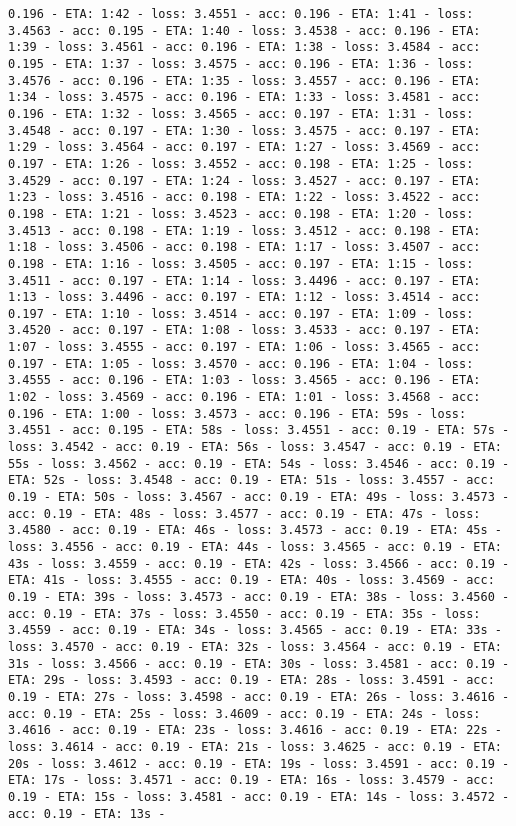 \documentclass[11pt]{article}
\begin{document}
\begin{Verbatim}[commandchars=\\\{\}]
0.196 - ETA: 1:42 - loss: 3.4551 - acc: 0.196 - ETA: 1:41 - loss: 3.4563 - acc: 0.195 - ETA: 1:40 - loss: 3.4538 - acc: 0.196 - ETA: 1:39 - loss: 3.4561 - acc: 0.196 - ETA: 1:38 - loss: 3.4584 - acc: 0.195 - ETA: 1:37 - loss: 3.4575 - acc: 0.196 - ETA: 1:36 - loss: 3.4576 - acc: 0.196 - ETA: 1:35 - loss: 3.4557 - acc: 0.196 - ETA: 1:34 - loss: 3.4575 - acc: 0.196 - ETA: 1:33 - loss: 3.4581 - acc: 0.196 - ETA: 1:32 - loss: 3.4565 - acc: 0.197 - ETA: 1:31 - loss: 3.4548 - acc: 0.197 - ETA: 1:30 - loss: 3.4575 - acc: 0.197 - ETA: 1:29 - loss: 3.4564 - acc: 0.197 - ETA: 1:27 - loss: 3.4569 - acc: 0.197 - ETA: 1:26 - loss: 3.4552 - acc: 0.198 - ETA: 1:25 - loss: 3.4529 - acc: 0.197 - ETA: 1:24 - loss: 3.4527 - acc: 0.197 - ETA: 1:23 - loss: 3.4516 - acc: 0.198 - ETA: 1:22 - loss: 3.4522 - acc: 0.198 - ETA: 1:21 - loss: 3.4523 - acc: 0.198 - ETA: 1:20 - loss: 3.4513 - acc: 0.198 - ETA: 1:19 - loss: 3.4512 - acc: 0.198 - ETA: 1:18 - loss: 3.4506 - acc: 0.198 - ETA: 1:17 - loss: 3.4507 - acc: 0.198 - ETA: 1:16 - loss: 3.4505 - acc: 0.197 - ETA: 1:15 - loss: 3.4511 - acc: 0.197 - ETA: 1:14 - loss: 3.4496 - acc: 0.197 - ETA: 1:13 - loss: 3.4496 - acc: 0.197 - ETA: 1:12 - loss: 3.4514 - acc: 0.197 - ETA: 1:10 - loss: 3.4514 - acc: 0.197 - ETA: 1:09 - loss: 3.4520 - acc: 0.197 - ETA: 1:08 - loss: 3.4533 - acc: 0.197 - ETA: 1:07 - loss: 3.4555 - acc: 0.197 - ETA: 1:06 - loss: 3.4565 - acc: 0.197 - ETA: 1:05 - loss: 3.4570 - acc: 0.196 - ETA: 1:04 - loss: 3.4555 - acc: 0.196 - ETA: 1:03 - loss: 3.4565 - acc: 0.196 - ETA: 1:02 - loss: 3.4569 - acc: 0.196 - ETA: 1:01 - loss: 3.4568 - acc: 0.196 - ETA: 1:00 - loss: 3.4573 - acc: 0.196 - ETA: 59s - loss: 3.4551 - acc: 0.195 - ETA: 58s - loss: 3.4551 - acc: 0.19 - ETA: 57s - loss: 3.4542 - acc: 0.19 - ETA: 56s - loss: 3.4547 - acc: 0.19 - ETA: 55s - loss: 3.4562 - acc: 0.19 - ETA: 54s - loss: 3.4546 - acc: 0.19 - ETA: 52s - loss: 3.4548 - acc: 0.19 - ETA: 51s - loss: 3.4557 - acc: 0.19 - ETA: 50s - loss: 3.4567 - acc: 0.19 - ETA: 49s - loss: 3.4573 - acc: 0.19 - ETA: 48s - loss: 3.4577 - acc: 0.19 - ETA: 47s - loss: 3.4580 - acc: 0.19 - ETA: 46s - loss: 3.4573 - acc: 0.19 - ETA: 45s - loss: 3.4556 - acc: 0.19 - ETA: 44s - loss: 3.4565 - acc: 0.19 - ETA: 43s - loss: 3.4559 - acc: 0.19 - ETA: 42s - loss: 3.4566 - acc: 0.19 - ETA: 41s - loss: 3.4555 - acc: 0.19 - ETA: 40s - loss: 3.4569 - acc: 0.19 - ETA: 39s - loss: 3.4573 - acc: 0.19 - ETA: 38s - loss: 3.4560 - acc: 0.19 - ETA: 37s - loss: 3.4550 - acc: 0.19 - ETA: 35s - loss: 3.4559 - acc: 0.19 - ETA: 34s - loss: 3.4565 - acc: 0.19 - ETA: 33s - loss: 3.4570 - acc: 0.19 - ETA: 32s - loss: 3.4564 - acc: 0.19 - ETA: 31s - loss: 3.4566 - acc: 0.19 - ETA: 30s - loss: 3.4581 - acc: 0.19 - ETA: 29s - loss: 3.4593 - acc: 0.19 - ETA: 28s - loss: 3.4591 - acc: 0.19 - ETA: 27s - loss: 3.4598 - acc: 0.19 - ETA: 26s - loss: 3.4616 - acc: 0.19 - ETA: 25s - loss: 3.4609 - acc: 0.19 - ETA: 24s - loss: 3.4616 - acc: 0.19 - ETA: 23s - loss: 3.4616 - acc: 0.19 - ETA: 22s - loss: 3.4614 - acc: 0.19 - ETA: 21s - loss: 3.4625 - acc: 0.19 - ETA: 20s - loss: 3.4612 - acc: 0.19 - ETA: 19s - loss: 3.4591 - acc: 0.19 - ETA: 17s - loss: 3.4571 - acc: 0.19 - ETA: 16s - loss: 3.4579 - acc: 0.19 - ETA: 15s - loss: 3.4581 - acc: 0.19 - ETA: 14s - loss: 3.4572 - acc: 0.19 - ETA: 13s - 
\end{Verbatim}
\end{document}
